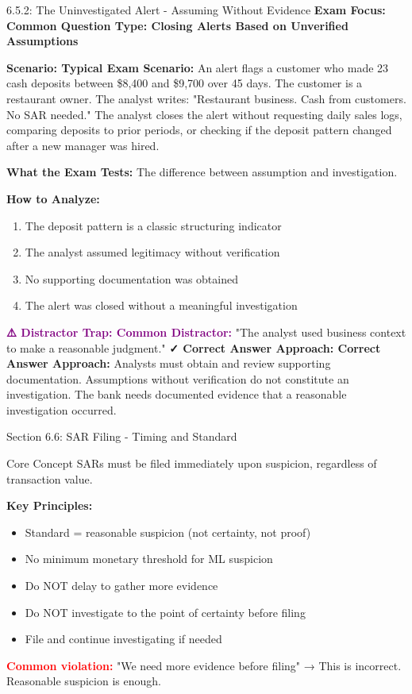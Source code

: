 \documentclass[11pt,a4paper]{beamer}
\newcommand{\redflag}[1]{\textcolor{red}{\textbf{#1}}}
\newcommand{\examfocus}[1]{\textcolor{orange!80!black}{\textbf{Exam Focus: #1}}}
\newcommand{\trap}[1]{\textcolor{purple}{\textbf{⚠️ Distractor Trap: #1}}}
\newcommand{\correct}[1]{\textcolor{green!50!black}{\textbf{✓ Correct Answer Approach: #1}}}
\newcommand{\scenario}[1]{\textcolor{blue!70!black}{\textbf{Scenario: #1}}}
\begin{document}
	\begin{frame}{6.5.2: The Uninvestigated Alert - Assuming Without Evidence}
		\examfocus{Common Question Type: Closing Alerts Based on Unverified Assumptions}
		
		\scenario{Typical Exam Scenario:}
		An alert flags a customer who made 23 cash deposits between \$8,400 and \$9,700 over 45 days. The customer is a restaurant owner. The analyst writes: "Restaurant business. Cash from customers. No SAR needed." The analyst closes the alert without requesting daily sales logs, comparing deposits to prior periods, or checking if the deposit pattern changed after a new manager was hired.
		
		\textbf{What the Exam Tests:} The difference between assumption and investigation.
		
		\textbf{How to Analyze:}
		\begin{enumerate}
			\item The deposit pattern is a classic structuring indicator
			\item The analyst assumed legitimacy without verification
			\item No supporting documentation was obtained
			\item The alert was closed without a meaningful investigation
		\end{enumerate}
		
		\trap{Common Distractor:} "The analyst used business context to make a reasonable judgment."
		\correct{Correct Answer Approach:} Analysts must obtain and review supporting documentation. Assumptions without verification do not constitute an investigation. The bank needs documented evidence that a reasonable investigation occurred.
	\end{frame}
	
	
	\begin{frame}{Section 6.6: SAR Filing - Timing and Standard}
		\begin{block}{Core Concept}
			SARs must be filed immediately upon suspicion, regardless of transaction value.
		\end{block}
		\textbf{Key Principles:}
		\begin{itemize}
			\item Standard = reasonable suspicion (not certainty, not proof)
			\item No minimum monetary threshold for ML suspicion
			\item Do NOT delay to gather more evidence
			\item Do NOT investigate to the point of certainty before filing
			\item File and continue investigating if needed
		\end{itemize}
		\redflag{Common violation:} "We need more evidence before filing" → This is incorrect. Reasonable suspicion is enough.
	\end{frame}
	
\end{document}
